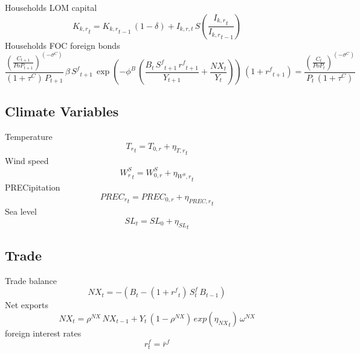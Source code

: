 Households LOM capital
\begin{dmath}
{{K_{k,r}}_{t}}={{K_{k,r}}_{t-1}}\, \left(1-{{\delta}}\right) + I_{k,r,t} \, S\left(\frac{{{I_{k,r}}_{t}}}{{{I_{k,r}}_{t-1}}}\right)
\end{dmath}
Households FOC foreign bonds
\begin{dmath}
\frac{\left(\frac{{C}_{t+1}}{{PoP}_{t+1}}\right)^{\left(-{{\sigma^{C}}}\right)}}{\left(1+{{\tau^{C}}}\right)\, {P}_{t+1}}\, {{\beta}}\, {S^{f}}_{t+1}\, \exp\left(-\phi^{B}\, \left(\frac{{B}_{t}\, {S^{f}}_{t+1}\, {{r^{f}}}_{t+1}}{{Y}_{t+1}}+\frac{{NX}_{t}}{{Y}_{t}}\right)\right)\, \left(1+{{r^{f}}}_{t+1}\right)=\frac{\left(\frac{{C}_{t}}{{PoP}_{t}}\right)^{\left(-{{\sigma^{C}}}\right)}}{{P}_{t}\, \left(1+{{\tau^{C}}}\right)}
\end{dmath}

\subsection{Climate Variables}
Temperature
\begin{dmath}
{{T_{r}}_{t}}={{T_{0,r}}}+{{\eta_{T,r}}_{t}}
\end{dmath}
Wind speed
\begin{dmath}
{{W_{r}^{S}}_{t}}={{W^{S}_{0,r}}}+{{\eta_{W^{S},r}}_{t}}
\end{dmath}
PRECipitation
\begin{dmath}
{{PREC_{r}}_{t}}={{PREC_{0,r}}}+{{\eta_{PREC,r}}_{t}}
\end{dmath}
Sea level
\begin{dmath}
{{SL}_{t}}={{SL_0}}+{{\eta_{SL}}_{t}}
\end{dmath}

\subsection{Trade}
Trade balance
\begin{dmath}
{NX_{t}}=-\left({B_{t}}-\left(1+{{r^{f}}_{t}}\right) \, S^{f}_{t} \, {B_{t-1}}\right)
\end{dmath}
Net exports
\begin{dmath}
{NX_{t}}={{\rho^{NX}}}\, {NX_{t-1}}+{Y_{t}}\, \left(1-{{\rho^{NX}}}\right)\, exp\left({{\eta_{NX}}_{t}}\right)\, {{\omega^{NX}}}
\end{dmath}
foreign interest rates
\begin{dmath}
r^{f}_{t} = \bar{r}^{f}
\end{dmath}

